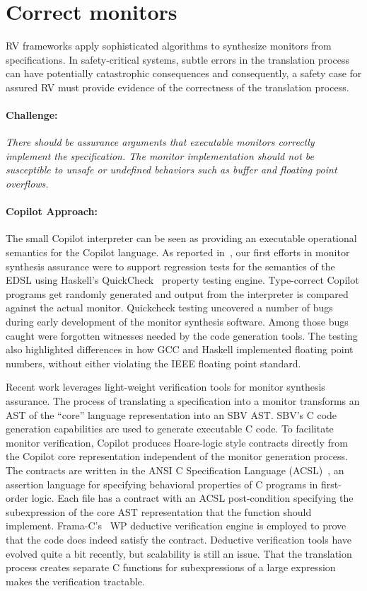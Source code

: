 \section{Correct monitors} \label{sec:codecorrect} 
 RV frameworks apply sophisticated algorithms to synthesize  monitors
 from specifications. In safety-critical systems, subtle errors in the
 translation process can have potentially catastrophic
 consequences and consequently, a safety case for assured RV must
 provide evidence of the correctness of the translation process.



\paragraph{Challenge:} \emph{There should be assurance arguments that
executable monitors correctly implement the specification.  The monitor implementation
should not be susceptible to unsafe or undefined behaviors such as
buffer and floating point overflows.}

\paragraph{Copilot Approach:}    
The  small  Copilot interpreter can be seen as providing an executable
operational semantics for the Copilot language.  As reported
in~\cite{pike-icfp-12}, our first efforts in monitor
synthesis assurance were  to support  regression tests for the semantics
of the EDSL using Haskell's QuickCheck~\cite{qc} property testing
engine. Type-correct Copilot programs get randomly generated and
output from the interpreter is compared against the actual
monitor. Quickcheck testing uncovered 
a number of bugs during early development of the monitor synthesis
software. Among those bugs caught were forgotten witnesses needed by
the code generation tools. The testing also highlighted 
differences in how GCC and Haskell implemented floating point numbers,
without either violating the IEEE floating point standard. 


Recent work  leverages light-weight verification tools for monitor
synthesis assurance.   The process of translating a specification into a monitor
transforms an AST of the ``core'' language representation into an SBV
AST.  SBV's C code generation capabilities are used to generate 
executable C code.  To facilitate monitor verification, Copilot 
produces Hoare-logic style contracts directly from the Copilot core
representation independent of the monitor generation process. The
contracts are written in the ANSI C Specification Language
(ACSL)~\cite{baudin09acsl}, an assertion language for specifying
behavioral properties of C programs in first-order logic.  Each file has a contract  with an ACSL 
post-condition  specifying the subexpression of the core
AST representation that the function should  implement. 
Frama-C's~\cite{framac} WP deductive verification engine is employed
to prove that the code does indeed satisfy the contract. Deductive
verification tools have evolved quite a bit recently, but scalability
is still an issue.  That the translation process creates separate C
functions for subexpressions of a large expression makes the
verification tractable. 


